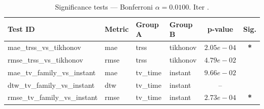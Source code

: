 ﻿%
\begin{table}[ht]
\centering
\caption[EEG reconstruction - Iteration it36]{Significance tests — Bonferroni $\alpha=0.0100$. Iter .}
\label{tab:sig_it36_3syn_beta_low_missing}
\small
\begin{tabular}{llllcc}
\toprule
Test ID & Metric & Group A & Group B & p-value & Sig. \\
\midrule
mae\_trss\_vs\_tikhonov & mae & trss & tikhonov & $2.05e-04$ & \textbf{*} \\
rmse\_trss\_vs\_tikhonov & rmse & trss & tikhonov & $4.79e-02$ &  \\
mae\_tv\_family\_vs\_instant & mae & tv\_time & instant & $9.66e-02$ &  \\
dtw\_tv\_family\_vs\_instant & dtw & tv\_time & instant & -- &  \\
rmse\_tv\_family\_vs\_instant & rmse & tv\_time & instant & $2.73e-04$ & \textbf{*} \\
\bottomrule
\end{tabular}
\end{table}







